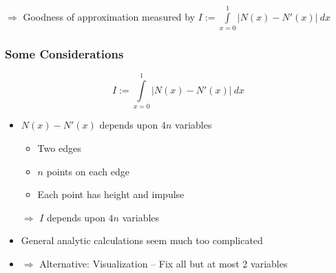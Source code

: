 \documentclass{beamer}
\begin{document}
\begin{frame}
  \begin{center}
    $\Rightarrow$ Goodness of approximation measured by $I := \int\limits_{x=0}^1 | N(x) - N'(x) |\ dx$
  \end{center}
\end{frame}

\begin{frame}
  \frametitle{Some Considerations}
  \begin{equation*}
    I := \int\limits_{x=0}^1 | N(x) - N'(x) |\ dx
  \end{equation*}
  \begin{itemize}
  \item $N(x)-N'(x)$ depends upon $4n$ variables
    \begin{itemize}
    \item Two edges
    \item $n$ points on each edge
    \item Each point has height and impulse
    \end{itemize}
  
    $\Rightarrow$ $I$ depends upon $4n$ variables
  \item General analytic calculations seem much too complicated
  \item $\Rightarrow$ Alternative: Visualization -- Fix all but at most 2 variables
  \end{itemize}
\end{frame}
\end{document}
